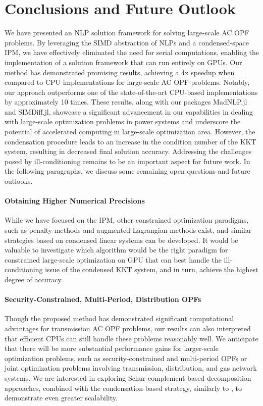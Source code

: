 \section{Conclusions and Future Outlook}\label{sec:conc}
We have presented an NLP solution framework for solving large-scale AC
OPF problems. By leveraging the SIMD abstraction of NLPs and a
condensed-space IPM, we have effectively eliminated the need for
serial computations, enabling the implementation of a solution
framework that can run entirely on GPUs. Our method has demonstrated
promising results, achieving a 4x speedup when compared to CPU
implementations for large-scale AC OPF problems. Notably, our approach
outperforms one of the state-of-the-art CPU-based implementations by
approximately 10 times. These results, along with our packages
MadNLP.jl and SIMDiff.jl, showcase a significant advancement in our
capabilities in dealing with large-scale optimization problems in
power systems and underscore the potential of accelerated computing in
large-scale optimization area. However, the condensation procedure
leads to an increase in the condition number of the KKT system,
resulting in decreased final solution accuracy. Addressing the
challenges posed by ill-conditioning remains to be an important aspect
for future work. In the following paragraphs, we discuss some
remaining open questions and future outlooks.

\paragraph*{Obtaining Higher Numerical Precisions}
While we have focused on the IPM, other constrained optimization
paradigms, such as penalty methods and augmented Lagrangian methods
exist, and similar strategies based on condensed linear systems can be
developed. It would be valuable to investigate which algorithm would
be the right paradigm for constrained large-scale optimization on GPU
that can best handle the ill-conditioning issue of the condensed KKT
system, and in turn, achieve the highest degree of accuracy.

\paragraph*{Security-Constrained, Multi-Period, Distribution OPFs}
Though the proposed method has demonstrated significant computational
advantages for transmission AC OPF problems, our results can also
interpreted that efficient CPUs can still handle these problems
reasonably well. We anticipate that there will be more substantial
performance gains for larger-scale optimization problems, such as
security-constrained and multi-period OPFs or joint optimization
problems involving transmission, distribution, and gas network
systems. We are interested in exploring Schur complement-based
decomposition approaches, combined with the condensation-based
strategy, similarly to \cite{pacaud2023parallel}, to demonstrate even
greater scalability.

